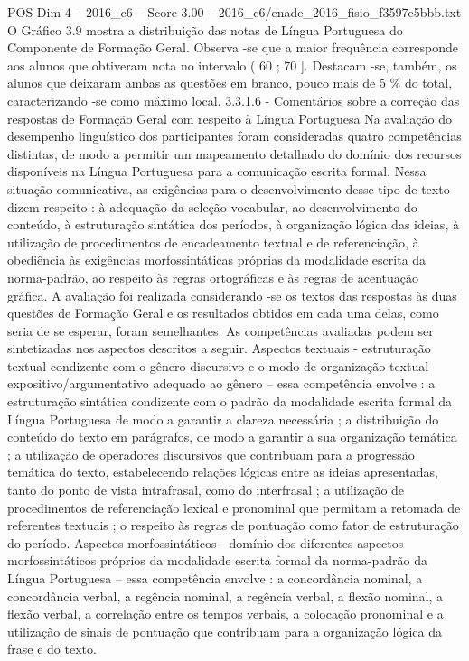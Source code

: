 \begin{textsample}{POS Dim 4 – 2016\_c6 – Score 3.00 – 2016\_c6/enade\_2016\_fisio\_f3597e5bbb.txt}
O Gráfico 3.9 mostra a distribuição das notas de Língua Portuguesa do Componente de Formação Geral.
Observa -se que a maior frequência corresponde aos alunos que obtiveram nota no intervalo ( 60 ; 70 ].
Destacam -se, também, os alunos que deixaram ambas as questões em branco, pouco mais de 5 \% do total, caracterizando -se como máximo local. 3.3.1.6 - Comentários sobre a correção das respostas de Formação Geral com respeito à Língua Portuguesa Na avaliação do desempenho linguístico dos participantes foram consideradas quatro competências distintas, de modo a permitir um mapeamento detalhado do domínio dos recursos disponíveis na Língua Portuguesa para a comunicação escrita formal.
Nessa situação comunicativa, as exigências para o desenvolvimento desse tipo de texto dizem respeito : à adequação da seleção vocabular, ao desenvolvimento do conteúdo, à estruturação sintática dos períodos, à organização lógica das ideias, à utilização de procedimentos de encadeamento textual e de referenciação, à obediência às exigências morfossintáticas próprias da modalidade escrita da norma-padrão, ao respeito às regras ortográficas e às regras de acentuação gráfica.
A avaliação foi realizada considerando -se os textos das respostas às duas questões de Formação Geral e os resultados obtidos em cada uma delas, como seria de se esperar, foram semelhantes.
As competências avaliadas podem ser sintetizadas nos aspectos descritos a seguir.
Aspectos textuais - estruturação textual condizente com o gênero discursivo e o modo de organização textual expositivo/argumentativo adequado ao gênero – essa competência envolve : a estruturação sintática condizente com o padrão da modalidade escrita formal da Língua Portuguesa de modo a garantir a clareza necessária ; a distribuição do conteúdo do texto em parágrafos, de modo a garantir a sua organização temática ; a utilização de operadores discursivos que contribuam para a progressão temática do texto, estabelecendo relações lógicas entre as ideias apresentadas, tanto do ponto de vista intrafrasal, como do interfrasal ; a utilização de procedimentos de referenciação lexical e pronominal que permitam a retomada de referentes textuais ; o respeito às regras de pontuação como fator de estruturação do período.
Aspectos morfossintáticos - domínio dos diferentes aspectos morfossintáticos próprios da modalidade escrita formal da norma-padrão da Língua Portuguesa – essa competência envolve : a concordância nominal, a concordância verbal, a regência nominal, a regência verbal, a flexão nominal, a flexão verbal, a correlação entre os tempos verbais, a colocação pronominal e a utilização de sinais de pontuação que contribuam para a organização lógica da frase e do texto.

\end{textsample}
